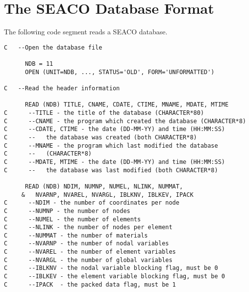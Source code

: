 \chapter{The SEACO Database Format} \label{appx:seaco}

The following code segment reads a SEACO database.

\begin{verbatim}
C   --Open the database file

      NDB = 11
      OPEN (UNIT=NDB, ..., STATUS='OLD', FORM='UNFORMATTED')

C   --Read the header information

      READ (NDB) TITLE, CNAME, CDATE, CTIME, MNAME, MDATE, MTIME
C      --TITLE - the title of the database (CHARACTER*80)
C      --CNAME - the program which created the database (CHARACTER*8)
C      --CDATE, CTIME - the date (DD-MM-YY) and time (HH:MM:SS)
C      --   the database was created (both CHARACTER*8)
C      --MNAME - the program which last modified the database
C      --   (CHARACTER*8)
C      --MDATE, MTIME - the date (DD-MM-YY) and time (HH:MM:SS)
C      --   the database was last modified (both CHARACTER*8)

      READ (NDB) NDIM, NUMNP, NUMEL, NLINK, NUMMAT,
     &   NVARNP, NVAREL, NVARGL, IBLKNV, IBLKEV, IPACK
C      --NDIM - the number of coordinates per node
C      --NUMNP - the number of nodes
C      --NUMEL - the number of elements
C      --NLINK - the number of nodes per element
C      --NUMMAT - the number of materials
C      --NVARNP - the number of nodal variables
C      --NVAREL - the number of element variables
C      --NVARGL - the number of global variables
C      --IBLKNV - the nodal variable blocking flag, must be 0
C      --IBLKEV - the element variable blocking flag, must be 0
C      --IPACK  - the packed data flag, must be 1
\end{verbatim}
\newpage

